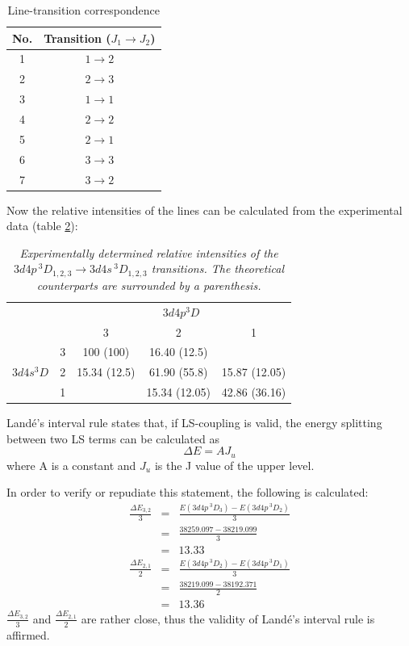 \documentclass[a4paper]{article}
\begin{document}
\begin{table}[htb!]
\centering
\begin{tabular}{c|c}
\hline
No. & Transition ($J_1 \to J_2$)\\
\hline
1 & $1 \to 2$ \\
2 & $2 \to 3$ \\
3 & $1 \to 1$ \\
4 & $2 \to 2$\\
5 & $2 \to 1$\\
6 & $3 \to 3$\\
7 & $3 \to 2$\\
\hline
\end{tabular}
\caption{Line-transition correspondence}
\label{tab:line-transition1}
\end{table}
Now the relative intensities of the lines can be calculated from the
experimental data (table \ref{tab:exp-intensity1}):
\begin{table}[htb!]
\centering
\begin{tabular}{cc|c|c|c|}
\cline{3-5}
& & \multicolumn{3}{c|}{$3d4p ^3D$}\\
\cline{3-5}
& & 3 & 2 & 1\\
\hline
\multicolumn{1}{|c|}{\multirow{3}{*}{$3d4s ^3D$}} & 3 & 100 (100) &
16.40 (12.5) & \\
\multicolumn{1}{|c|}{} & 2 & 15.34 (12.5) & 61.90 (55.8) & 15.87 (12.05) \\
\multicolumn{1}{|c|}{} & 1 & & 15.34 (12.05) & 42.86 (36.16) \\
\hline
\end{tabular}
\caption{\it Experimentally determined relative intensities of the
  $3d4p\,^3D_{1,2,3} \to 3d4s\,^3D_{1,2,3}$ transitions. The
  theoretical counterparts are surrounded by a parenthesis.}
\label{tab:exp-intensity1}
\end{table}
Land\'e's interval rule states that, if LS-coupling is valid, the
energy splitting between two LS terms can be calculated as
\[
\Delta E = A J_u
\]
where A is a constant and $J_u$ is the J value of the upper level.

In order to verify or repudiate this statement, the following is
calculated:
\begin{eqnarray*}
\frac{\Delta E_{3,2}}{3} &=& \frac{E(3d4p\,^3D_3) -
  E(3d4p\,^3D_2)}{3}\\
&=& \frac{38259.097 - 38219.099}{3} \\
&=& 13.33 \\
\frac{\Delta E_{2,1}}{2} &=& \frac{E(3d4p\,^3D_2) -
  E(3d4p\,^3D_1)}{3}\\
&=& \frac{38219.099 - 38192.371}{2} \\
&=& 13.36
\end{eqnarray*}
$\frac{\Delta E_{3,2}}{3}$ and $\frac{\Delta E_{2,1}}{2}$ are rather
close, thus the validity of Land\'e's interval rule is affirmed.
\end{document}
